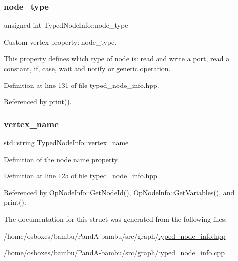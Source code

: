 \mbox{\label{structTypedNodeInfo_affdcb12b1e38b9bec3126cfc9c16a653}} 
\subsubsection{\texorpdfstring{node\+\_\+type}{node\_type}}
{\footnotesize\ttfamily unsigned int Typed\+Node\+Info\+::node\+\_\+type}



Custom vertex property\+: node\+\_\+type. 

This property defines which type of node is\+: read and write a port, read a constant, if, case, wait and notify or generic operation. 

Definition at line 131 of file typed\+\_\+node\+\_\+info.\+hpp.



Referenced by print().

\mbox{\label{structTypedNodeInfo_a19d4dd6419b9bc65a818ab0bf00565f4}} 
\subsubsection{\texorpdfstring{vertex\+\_\+name}{vertex\_name}}
{\footnotesize\ttfamily std\+::string Typed\+Node\+Info\+::vertex\+\_\+name}



Definition of the node name property. 



Definition at line 125 of file typed\+\_\+node\+\_\+info.\+hpp.



Referenced by Op\+Node\+Info\+::\+Get\+Node\+Id(), Op\+Node\+Info\+::\+Get\+Variables(), and print().



The documentation for this struct was generated from the following files\+:\begin{DoxyCompactItemize}
\item 
/home/osboxes/bambu/\+Pand\+A-\/bambu/src/graph/\hyperlink{typed__node__info_8hpp}{typed\+\_\+node\+\_\+info.\+hpp}\item 
/home/osboxes/bambu/\+Pand\+A-\/bambu/src/graph/\hyperlink{typed__node__info_8cpp}{typed\+\_\+node\+\_\+info.\+cpp}\end{DoxyCompactItemize}
